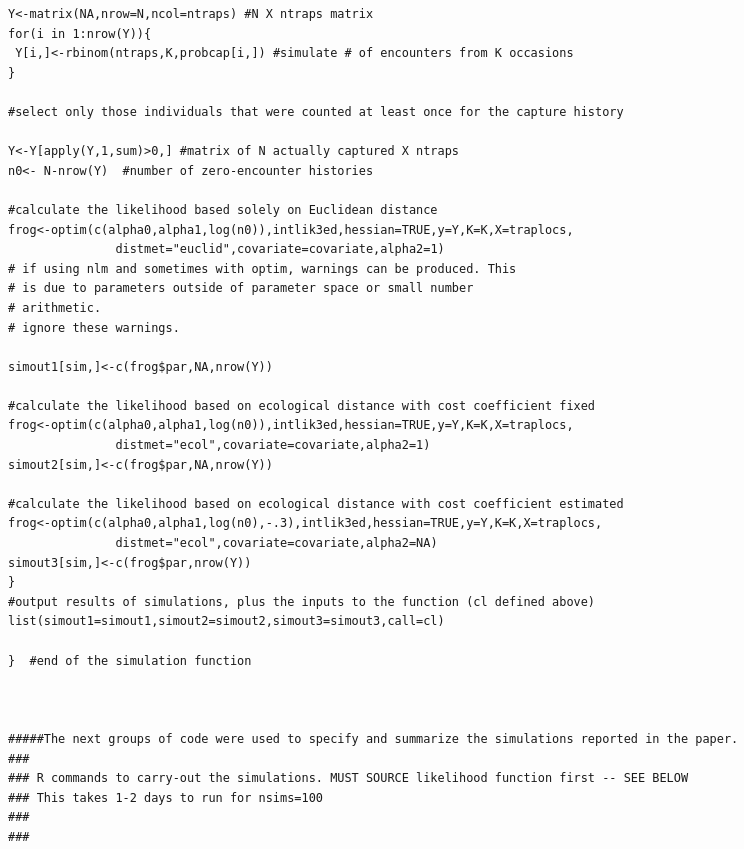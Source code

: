 \documentclass[12pt]{article}
\begin{document}
\begin{spacing}{1.2}
{\begin{verbatim}
Y<-matrix(NA,nrow=N,ncol=ntraps) #N X ntraps matrix
for(i in 1:nrow(Y)){
 Y[i,]<-rbinom(ntraps,K,probcap[i,]) #simulate # of encounters from K occasions
}

#select only those individuals that were counted at least once for the capture history

Y<-Y[apply(Y,1,sum)>0,] #matrix of N actually captured X ntraps
n0<- N-nrow(Y)  #number of zero-encounter histories

#calculate the likelihood based solely on Euclidean distance
frog<-optim(c(alpha0,alpha1,log(n0)),intlik3ed,hessian=TRUE,y=Y,K=K,X=traplocs,
               distmet="euclid",covariate=covariate,alpha2=1)
# if using nlm and sometimes with optim, warnings can be produced. This
# is due to parameters outside of parameter space or small number 
# arithmetic. 
# ignore these warnings.

simout1[sim,]<-c(frog$par,NA,nrow(Y))

#calculate the likelihood based on ecological distance with cost coefficient fixed
frog<-optim(c(alpha0,alpha1,log(n0)),intlik3ed,hessian=TRUE,y=Y,K=K,X=traplocs,
               distmet="ecol",covariate=covariate,alpha2=1)
simout2[sim,]<-c(frog$par,NA,nrow(Y))

#calculate the likelihood based on ecological distance with cost coefficient estimated
frog<-optim(c(alpha0,alpha1,log(n0),-.3),intlik3ed,hessian=TRUE,y=Y,K=K,X=traplocs,
               distmet="ecol",covariate=covariate,alpha2=NA)
simout3[sim,]<-c(frog$par,nrow(Y))
}
#output results of simulations, plus the inputs to the function (cl defined above) 
list(simout1=simout1,simout2=simout2,simout3=simout3,call=cl)

}  #end of the simulation function



#####The next groups of code were used to specify and summarize the simulations reported in the paper.
###
### R commands to carry-out the simulations. MUST SOURCE likelihood function first -- SEE BELOW
### This takes 1-2 days to run for nsims=100
###
###


\end{verbatim}}
\end{spacing}
\end{document}

